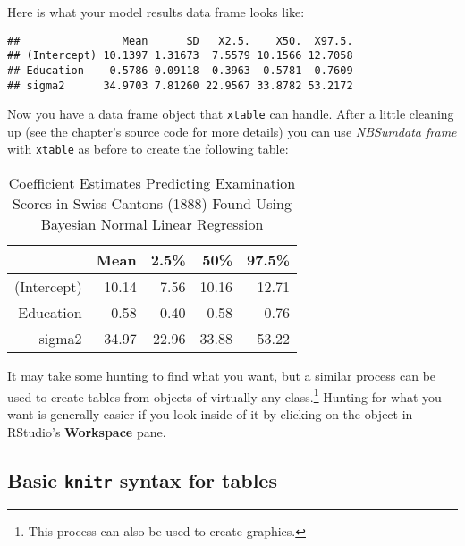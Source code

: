 \noindent Here is what your model results data frame looks like:

\begin{knitrout}
\color{fgcolor}\begin{kframe}
\begin{verbatim}
##                Mean      SD   X2.5.    X50.  X97.5.
## (Intercept) 10.1397 1.31673  7.5579 10.1566 12.7058
## Education    0.5786 0.09118  0.3963  0.5781  0.7609
## sigma2      34.9703 7.81260 22.9567 33.8782 53.2172
\end{verbatim}
\end{kframe}
\end{knitrout}


\noindent Now you have a data frame object that {\tt{xtable}} can handle. After a little cleaning up (see the chapter's source code for more details) you can use {\emph{NBSumdata frame}} with {\tt{xtable}} as before to create the following table:
\vspace{0.5cm}

\begin{table}[ht]
\begin{center}
\begin{tabular}{rrrrr}
  \hline
 & Mean & 2.5\% & 50\% & 97.5\% \\ 
  \hline
(Intercept) & 10.14 & 7.56 & 10.16 & 12.71 \\ 
  Education & 0.58 & 0.40 & 0.58 & 0.76 \\ 
  sigma2 & 34.97 & 22.96 & 33.88 & 53.22 \\ 
   \hline
\end{tabular}
\caption{Coefficient Estimates Predicting Examination Scores in Swiss Cantons (1888) Found Using Bayesian Normal Linear Regression}
\end{center}
\end{table}



It may take some hunting to find what you want, but a similar process can be used to create tables from objects of virtually any class.\footnote{This process can also be used to create graphics.} Hunting for what you want is generally easier if you look inside of it by clicking on the object in RStudio's {\bf{Workspace}} pane.

\subsection{Basic \texttt{knitr} syntax for tables}

